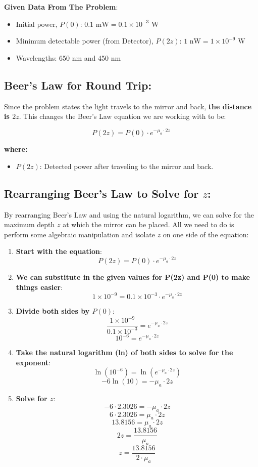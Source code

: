 \documentclass[12pt]{article}
\begin{document}
\textbf{Given Data From The Problem}:
\begin{itemize}
    \item Initial power, \( P(0) \): \( 0.1 \text{ mW} = 0.1 \times 10^{-3} \text{ W} \)
    \item Minimum detectable power (from Detector), \( P(2z) \): \( 1 \text{ nW} = 1 \times 10^{-9} \text{ W} \)
    \item Wavelengths: 650 nm and 450 nm
\end{itemize}

\subsection*{Beer's Law for Round Trip:}
Since the problem states the light travels to the mirror and back, \textbf{the distance is \( 2z \)}. This changes the Beer's Law equation we are working with to be:

\[ P(2z) = P(0) \cdot e^{-\mu_a \cdot 2z} \]

\textbf{where:}
\begin{itemize}
    \item \( P(2z) \): Detected power after traveling to the mirror and back.
\end{itemize}

\subsection*{Rearranging Beer's Law to Solve for \( z \):}
By rearranging Beer's Law and using the natural logarithm, we can solve for the maximum depth \( z \) at which the mirror can be placed. All we need to do is perform some algebraic manipulation and isolate \( z \) on one side of the equation:

\begin{enumerate}
    \item \textbf{Start with the equation}:
    \[ P(2z) = P(0) \cdot e^{-\mu_a \cdot 2z} \]

    \item \textbf{ We can substitute in the given values for P(2z) and P(0) to make things easier}:
    \[ 1 \times 10^{-9} = 0.1 \times 10^{-3} \cdot e^{-\mu_a \cdot 2z} \]

    \item \textbf{Divide both sides by \( P(0) \)}:
    \[ \frac{1 \times 10^{-9}}{0.1 \times 10^{-3}} = e^{-\mu_a \cdot 2z} \]
    \[ 10^{-6} = e^{-\mu_a \cdot 2z} \]

    \item \textbf{Take the natural logarithm (ln) of both sides to solve for the exponent}:
    \[ \ln(10^{-6}) = \ln(e^{-\mu_a \cdot 2z}) \]
    \[ -6 \ln(10) = -\mu_a \cdot 2z \]

    \item \textbf{Solve for \( z \)}:
    \[ -6 \cdot 2.3026 = -\mu_a \cdot 2z \]
    \[ 6 \cdot 2.3026 = \mu_a \cdot 2z \]
    \[ 13.8156 = \mu_a \cdot 2z \]
    \[ 2z = \frac{13.8156}{\mu_a} \]
    \[ z = \frac{13.8156}{2 \cdot \mu_a} \]
\end{enumerate}
\end{document}
